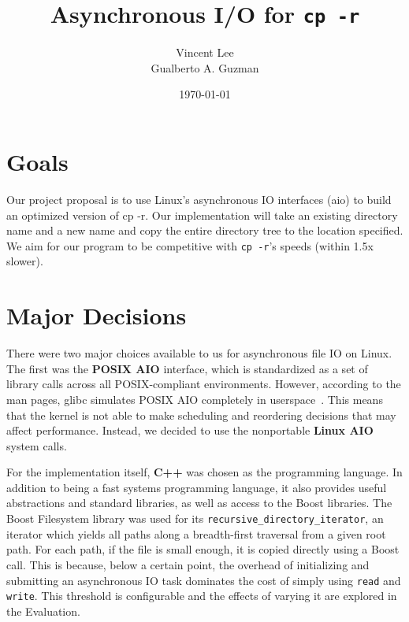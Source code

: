 \documentclass[11pt]{article}
\begin{document}
\title{Asynchronous I/O for \texttt{cp -r}}
\date{\today}
\author{Vincent Lee \\
        Gualberto A. Guzman}

\maketitle

\section{Goals}

Our project proposal is to use Linux's asynchronous IO interfaces (aio) to build
an optimized version of cp -r. Our implementation will take an existing
directory name and a new name and copy the entire directory tree to the location
specified. We aim for our program to be competitive with \texttt{cp -r}'s speeds (within 1.5x slower).

\section{Major Decisions} 

There were two major choices available to us for asynchronous file IO on Linux.
The first was the \textbf{POSIX AIO} interface, which is standardized as a set
of library calls across all POSIX-compliant environments. However, according to
the man pages, glibc simulates POSIX AIO completely in userspace~\cite{aio7}.
This means that the kernel is not able to make scheduling and reordering
decisions that may affect performance. Instead, we decided to use the
nonportable \textbf{Linux AIO} system calls.

For the implementation itself, \textbf{C++} was chosen as the programming
language. In addition to being a fast systems programming language, it also
provides useful abstractions and standard libraries, as well as access to the
Boost libraries. The Boost Filesystem library was used for its
\texttt{recursive\_directory\_iterator}, an iterator which yields all paths
along a breadth-first traversal from a given root path. For each path, if the
file is small enough, it is copied directly using a Boost call. This is because,
below a certain point, the overhead of initializing and submitting an
asynchronous IO task dominates the cost of simply using \texttt{read} and
\texttt{write}. This threshold is configurable and the effects of varying it are
explored in the Evaluation.
\end{document}
